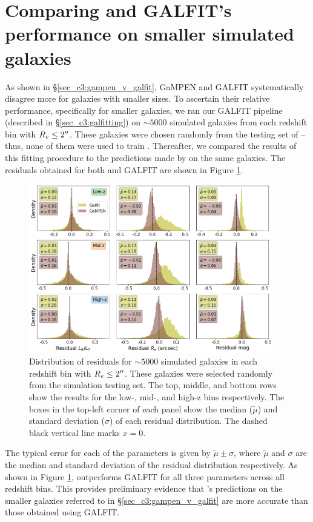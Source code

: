 \section{Comparing \gampen{} and GALFIT's performance on smaller simulated galaxies} \label{ap:sec_c3:gapemn_v_galfit}

As shown in \S \ref{sec_c3:gampen_v_galfit}, GaMPEN and GALFIT systematically disagree more for galaxies with smaller sizes. To ascertain their relative performance, specifically for smaller galaxies, we ran our GALFIT pipeline (described in \S \ref{sec_c3:galfitting}) on $\sim5000$ simulated galaxies from each redshift bin with $R_e \leq 2\mbox{$^{\prime\prime}$}$. These galaxies were chosen randomly from the testing set of \gampen{} -- thus, none of them were used to train \gampen{}. Thereafter, we compared the results of this fitting procedure to the predictions made by \gampen{} on the same galaxies. The residuals obtained for both \gampen{} and GALFIT are shown in Figure \ref{fig_c3:gampen_v_galfit}.

\begin{figure}[htb]
    \centering
    \includegraphics[width = 0.95\textwidth]{gampen_v_galfit.png}
    \caption{Distribution of residuals for $\sim5000$ simulated galaxies in each redshift bin with $R_e \leq 2\mbox{$^{\prime\prime}$}$.  These galaxies were selected randomly from the simulation testing set. The top, middle, and bottom rows show the results for the low-, mid-, and high-z bins respectively. The boxes in the top-left corner of each panel show the median ($\tilde{\mu}$) and standard deviation ($\sigma$) of each residual distribution. The dashed black vertical line marks $x=0$. }
    \label{fig_c3:gampen_v_galfit}
\end{figure}

The typical error for each of the parameters is given by $\tilde{\mu}\pm\sigma$, where $\tilde{\mu}$ and $\sigma$ are the median and standard deviation of the residual distribution respectively. As shown in Figure \ref{fig_c3:gampen_v_galfit}, \gampen{} outperforms GALFIT for all three parameters across all redshift bins. This provides preliminary evidence that \gampen{}'s predictions on the smaller galaxies referred to in \S \ref{sec_c3:gampen_v_galfit} are more accurate than those obtained using GALFIT.

